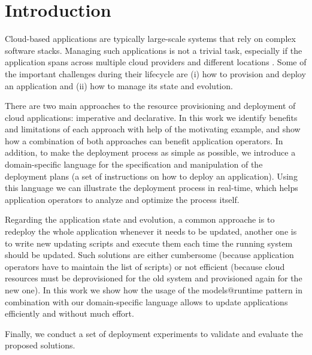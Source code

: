 
\chapter{Introduction} %

\label{Chapter1} %



\noindent Cloud-based applications are typically large-scale systems that rely on complex software stacks. Managing such applications is not a trivial task, especially if the application spans across multiple cloud providers and different locations \cite{elmroth2011self}. Some of the important challenges during their lifecycle are (i) how to provision and deploy an application and (ii) how to manage its state and evolution. 

There are two main approaches to the resource provisioning and deployment of cloud applications: imperative and declarative. In this work we identify benefits and limitations of each approach with help of the motivating example, and show how a combination of both approaches can benefit application operators. In addition, to make the deployment process as simple as possible, we introduce a domain-specific language for the specification and manipulation of the deployment plans (a set of instructions on how to deploy an application). Using this language we can illustrate the deployment process in real-time, which helps application operators to analyze and optimize the process itself.  

Regarding the application state and evolution, a  common approache is to redeploy the whole application whenever it needs to be updated, another one is to write new updating scripts and execute them each time the running system should be updated. Such solutions are either cumbersome (because application operators have to maintain the list of scripts) or not efficient (because cloud resources must be deprovisioned for the old system and provisioned again for the new one). In this work we show how the usage of the models@runtime pattern in combination with our domain-specific language allows to update applications efficiently and without much effort.

Finally, we conduct a set of deployment experiments to validate and evaluate the proposed solutions.

